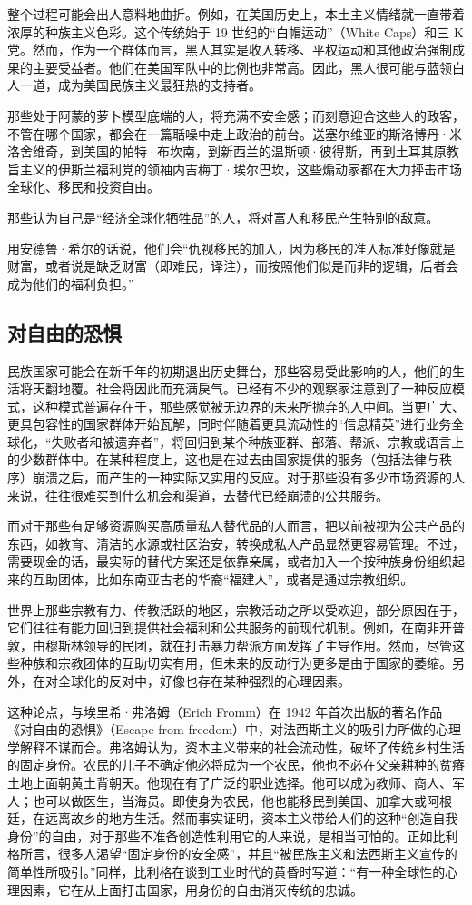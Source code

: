 整个过程可能会出人意料地曲折。例如，在美国历史上，本土主义情绪就一直带着浓厚的种族主义色彩。这个传统始于 19 世纪的“白帽运动”（White Caps）和三 K 党。然而，作为一个群体而言，黑人其实是收入转移、平权运动和其他政治强制成果的主要受益者。他们在美国军队中的比例也非常高。因此，黑人很可能与蓝领白人一道，成为美国民族主义最狂热的支持者。

那些处于阿蒙的萝卜模型底端的人，将充满不安全感；而刻意迎合这些人的政客，不管在哪个国家，都会在一篇聒噪中走上政治的前台。送塞尔维亚的斯洛博丹·米洛舍维奇，到美国的帕特·布坎南，到新西兰的温斯顿·彼得斯，再到土耳其原教旨主义的伊斯兰福利党的领袖内吉梅丁·埃尔巴坎，这些煽动家都在大力抨击市场全球化、移民和投资自由。

那些认为自己是“经济全球化牺牲品”的人，将对富人和移民产生特别的敌意。

用安德鲁·希尔的话说，他们会“仇视移民的加入，因为移民的准入标准好像就是财富，或者说是缺乏财富（即难民，译注），而按照他们似是而非的逻辑，后者会成为他们的福利负担。”

\subsection{对自由的恐惧}
民族国家可能会在新千年的初期退出历史舞台，那些容易受此影响的人，他们的生活将天翻地覆。社会将因此而充满戾气。已经有不少的观察家注意到了一种反应模式，这种模式普遍存在于，那些感觉被无边界的未来所抛弃的人中间。当更广大、更具包容性的国家群体开始瓦解，同时伴随着更具流动性的“信息精英”进行业务全球化，“失败者和被遗弃者”，将回归到某个种族亚群、部落、帮派、宗教或语言上的少数群体中。在某种程度上，这也是在过去由国家提供的服务（包括法律与秩序）崩溃之后，而产生的一种实际又实用的反应。对于那些没有多少市场资源的人来说，往往很难买到什么机会和渠道，去替代已经崩溃的公共服务。

而对于那些有足够资源购买高质量私人替代品的人而言，把以前被视为公共产品的东西，如教育、清洁的水源或社区治安，转换成私人产品显然更容易管理。不过，需要现金的话，最实际的替代方案还是依靠亲属，或者加入一个按种族身份组织起来的互助团体，比如东南亚古老的华裔“福建人”，或者是通过宗教组织。

世界上那些宗教有力、传教活跃的地区，宗教活动之所以受欢迎，部分原因在于，它们往往有能力回归到提供社会福利和公共服务的前现代机制。例如，在南非开普敦，由穆斯林领导的民团，就在打击暴力帮派方面发挥了主导作用。然而，尽管这些种族和宗教团体的互助切实有用，但未来的反动行为更多是由于国家的萎缩。另外，在对全球化的反对中，好像也存在某种强烈的心理因素。

这种论点，与埃里希·弗洛姆（Erich Fromm）在 1942 年首次出版的著名作品《对自由的恐惧》（Escape from freedom）中，对法西斯主义的吸引力所做的心理学解释不谋而合。弗洛姆认为，资本主义带来的社会流动性，破坏了传统乡村生活的固定身份。农民的儿子不确定他必将成为一个农民，他也不必在父亲耕种的贫瘠土地上面朝黄土背朝天。他现在有了广泛的职业选择。他可以成为教师、商人、军人；也可以做医生，当海员。即使身为农民，他也能移民到美国、加拿大或阿根廷，在远离故乡的地方生活。然而事实证明，资本主义带给人们的这种“创造自我身份”的自由，对于那些不准备创造性利用它的人来说，是相当可怕的。正如比利格所言，很多人渴望“固定身份的安全感”，并且“被民族主义和法西斯主义宣传的简单性所吸引。”同样，比利格在谈到工业时代的黄昏时写道：“有一种全球性的心理因素，它在从上面打击国家，用身份的自由消灭传统的忠诚。

